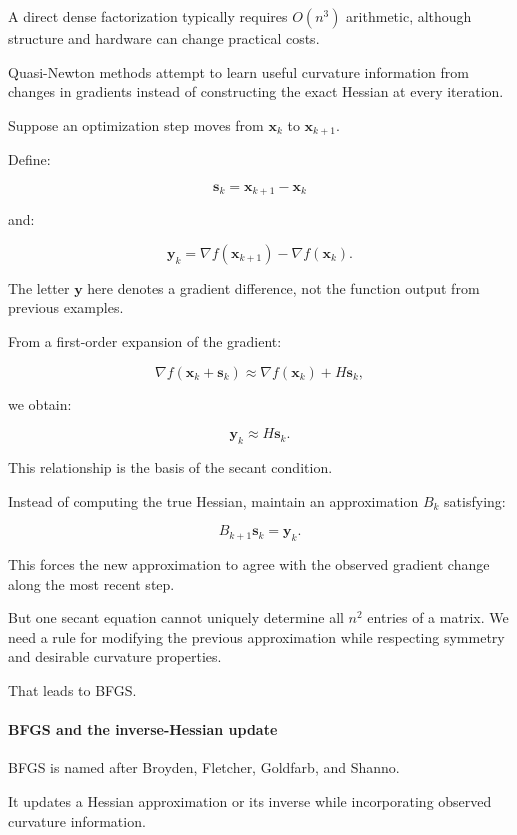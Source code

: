 A direct dense factorization typically requires \(O(n^3)\) arithmetic, although structure and hardware can change practical costs.

Quasi-Newton methods attempt to learn useful curvature information from changes in gradients instead of constructing the exact Hessian at every iteration.

Suppose an optimization step moves from \(\mathbf x_k\) to \(\mathbf x_{k+1}\).

Define:

\[
\boxed{ \mathbf s_k=\mathbf x_{k+1}-\mathbf x_k }
\]

and:

\[
\boxed{ \mathbf y_k= \nabla f(\mathbf x_{k+1})- \nabla f(\mathbf x_k) }.
\]

The letter \(\mathbf y\) here denotes a gradient difference, not the function output from previous examples.

From a first-order expansion of the gradient:

\[
\nabla f(\mathbf x_k+\mathbf s_k) \approx \nabla f(\mathbf x_k)+H\mathbf s_k,
\]

we obtain:

\[
\boxed{ \mathbf y_k\approx H\mathbf s_k }.
\]

This relationship is the basis of the secant condition.

Instead of computing the true Hessian, maintain an approximation \(B_k\) satisfying:

\[
\boxed{ B_{k+1}\mathbf s_k=\mathbf y_k }.
\]

This forces the new approximation to agree with the observed gradient change along the most recent step.

But one secant equation cannot uniquely determine all \(n^2\) entries of a matrix. We need a rule for modifying the previous approximation while respecting symmetry and desirable curvature properties.

That leads to BFGS.

\paragraph{BFGS and the inverse-Hessian update}\label{bfgs-and-the-inverse-hessian-update}

BFGS is named after Broyden, Fletcher, Goldfarb, and Shanno.

It updates a Hessian approximation or its inverse while incorporating observed curvature information.

